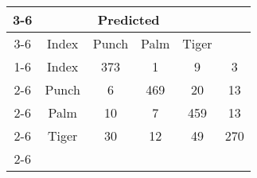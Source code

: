 \documentclass{standalone}
\begin{document}
 
 \begin{tabular}{|c |c |c |c |c |c |}
\cline{3-6}\multicolumn{2}{c|}{} & \multicolumn{4}{c|}{Predicted} \\ 
\cline{3-6} \multicolumn{2}{c |}{ } & Index & Punch & Palm & Tiger\\ 
\cline{1-6}\multirow{4}{*}{\rotatebox[origin=c]{90}{Actual}} & Index & 373 & 1 & 9 & 3\\ 
 \cline{2-6} & Punch & 6 & 469 & 20 & 13\\ 
 \cline{2-6} & Palm & 10 & 7 & 459 & 13\\ 
 \cline{2-6} & Tiger & 30 & 12 & 49 & 270\\ 
 \cline{2-6}\hline \end{tabular}
 
\end{document}
